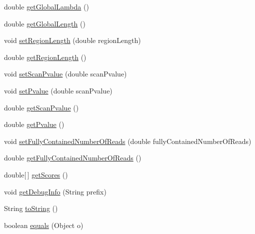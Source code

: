 \begin{DoxyCompactItemize}
double \hyperlink{classumms_1_1core_1_1model_1_1score_1_1_scan_statistic_score_aa11ef30139134a9dd645e3470ca94a40}{get\+Global\+Lambda} ()
\item 
double \hyperlink{classumms_1_1core_1_1model_1_1score_1_1_scan_statistic_score_a3cf3f87c128b3fd35d5ce49ed496c43e}{get\+Global\+Length} ()
\item 
void \hyperlink{classumms_1_1core_1_1model_1_1score_1_1_scan_statistic_score_a276f9bc08e9d12135b4268dd6399eed1}{set\+Region\+Length} (double region\+Length)
\item 
double \hyperlink{classumms_1_1core_1_1model_1_1score_1_1_scan_statistic_score_adb697c290aecf4aab182532829f75c6b}{get\+Region\+Length} ()
\item 
void \hyperlink{classumms_1_1core_1_1model_1_1score_1_1_scan_statistic_score_a3faddbf93b31f5f9c6b0c5c3530fba06}{set\+Scan\+Pvalue} (double scan\+Pvalue)
\item 
void \hyperlink{classumms_1_1core_1_1model_1_1score_1_1_scan_statistic_score_a6f3939d4183715745840796aba5a3f81}{set\+Pvalue} (double scan\+Pvalue)
\item 
double \hyperlink{classumms_1_1core_1_1model_1_1score_1_1_scan_statistic_score_ab240e94386a0a48a6f32be20f15c6976}{get\+Scan\+Pvalue} ()
\item 
double \hyperlink{classumms_1_1core_1_1model_1_1score_1_1_scan_statistic_score_a716eb4cc7d4c585cfb543cc6ede98dc8}{get\+Pvalue} ()
\item 
void \hyperlink{classumms_1_1core_1_1model_1_1score_1_1_scan_statistic_score_a60e610470e2673a071b504431a7bf9a6}{set\+Fully\+Contained\+Number\+Of\+Reads} (double fully\+Contained\+Number\+Of\+Reads)
\item 
double \hyperlink{classumms_1_1core_1_1model_1_1score_1_1_scan_statistic_score_ade40e9b117e0ed167285ec03445e5743}{get\+Fully\+Contained\+Number\+Of\+Reads} ()
\item 
double\mbox{[}$\,$\mbox{]} \hyperlink{classumms_1_1core_1_1model_1_1score_1_1_scan_statistic_score_a16b8e6d7030540cc9f22c249cbc81cfe}{get\+Scores} ()
\item 
void \hyperlink{classumms_1_1core_1_1model_1_1score_1_1_scan_statistic_score_a392a0b75ab2921bd7b85361c63295f7c}{get\+Debug\+Info} (String prefix)
\item 
String \hyperlink{classumms_1_1core_1_1model_1_1score_1_1_scan_statistic_score_a4349f7847a60dd847beecdfe21b3251e}{to\+String} ()
\item 
boolean \hyperlink{classumms_1_1core_1_1model_1_1score_1_1_scan_statistic_score_a68c6f7ddaad3900372b873249c0ace99}{equals} (Object o)
\end{DoxyCompactItemize}
